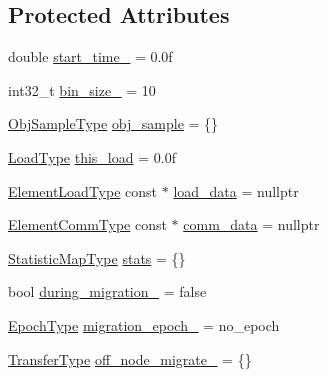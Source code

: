 \subsection*{Protected Attributes}
\begin{DoxyCompactItemize}
\item 
double \hyperlink{structvt_1_1vrt_1_1collection_1_1lb_1_1_base_l_b_a457dff7a12e34494fa0537c78120eb41}{start\+\_\+time\+\_\+} = 0.\+0f
\item 
int32\+\_\+t \hyperlink{structvt_1_1vrt_1_1collection_1_1lb_1_1_base_l_b_a2623b9a1e60be9f6413d86fbff9e80bf}{bin\+\_\+size\+\_\+} = 10
\item 
\hyperlink{structvt_1_1vrt_1_1collection_1_1lb_1_1_base_l_b_a331d7da5bbf2883238427d86b54ddd7b}{Obj\+Sample\+Type} \hyperlink{structvt_1_1vrt_1_1collection_1_1lb_1_1_base_l_b_a82775a8f051e975a1a7f3046e7af61ac}{obj\+\_\+sample} = \{\}
\item 
\hyperlink{structvt_1_1vrt_1_1collection_1_1lb_1_1_base_l_b_a215e22b9f12678303f49615ae3be05cc}{Load\+Type} \hyperlink{structvt_1_1vrt_1_1collection_1_1lb_1_1_base_l_b_ab7df874591552c346fc77858983fbbec}{this\+\_\+load} = 0.\+0f
\item 
\hyperlink{structvt_1_1vrt_1_1collection_1_1lb_1_1_base_l_b_aa286d31a0820a8fc9218ccb858368fca}{Element\+Load\+Type} const  $\ast$ \hyperlink{structvt_1_1vrt_1_1collection_1_1lb_1_1_base_l_b_ac430d066bb19421d6241753059e8f4c8}{load\+\_\+data} = nullptr
\item 
\hyperlink{structvt_1_1vrt_1_1collection_1_1lb_1_1_base_l_b_ac3f8560bfe41aa593eb7d5bd1241cc4c}{Element\+Comm\+Type} const  $\ast$ \hyperlink{structvt_1_1vrt_1_1collection_1_1lb_1_1_base_l_b_a8d519b94ce4741da7049cb2b7b513963}{comm\+\_\+data} = nullptr
\item 
\hyperlink{structvt_1_1vrt_1_1collection_1_1lb_1_1_base_l_b_a6e8dead5546b2054f604ca258e1e815e}{Statistic\+Map\+Type} \hyperlink{structvt_1_1vrt_1_1collection_1_1lb_1_1_base_l_b_a249359351566423733a7391dcdc2e203}{stats} = \{\}
\item 
bool \hyperlink{structvt_1_1vrt_1_1collection_1_1lb_1_1_base_l_b_a5d12e74646afe35018722650681512c7}{during\+\_\+migration\+\_\+} = false
\item 
\hyperlink{namespacevt_a985a5adf291c34a3ca263b3378388236}{Epoch\+Type} \hyperlink{structvt_1_1vrt_1_1collection_1_1lb_1_1_base_l_b_a542fc9b588392bd5bc30554b2b53c96c}{migration\+\_\+epoch\+\_\+} = no\+\_\+epoch
\item 
\hyperlink{structvt_1_1vrt_1_1collection_1_1lb_1_1_base_l_b_a0a5f834082d85c558bdaf84c464c1ead}{Transfer\+Type} \hyperlink{structvt_1_1vrt_1_1collection_1_1lb_1_1_base_l_b_aa6e16e52738ab5d6f85be39641db94bd}{off\+\_\+node\+\_\+migrate\+\_\+} = \{\}

\end{DoxyCompactItemize}
